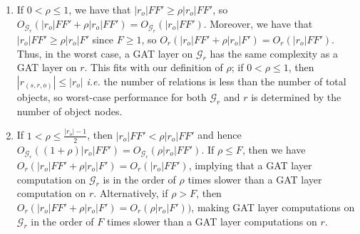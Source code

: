 \begin{enumerate}
    \item If \(0 < \rho \leq 1\), we have that \(|r_o|FF' \geq \rho|r_o|FF'\), so \(O_{\mathcal{G}_r}(|r_o|FF' + \rho|r_o|FF') = O_{\mathcal{G}_r}(|r_o|FF')\). Moreover, we have that \(|r_o|FF' \geq \rho|r_o|F'\) since \(F \geq 1\), so \(O_r(|r_o|FF' + \rho|r_o|F') = O_r(|r_o|FF')\). Thus, in the worst case, a GAT layer on \(\mathcal{G}_r\) has the same complexity as a GAT layer on \(r\). This fits with our definition of \(\rho\); if \(0 < \rho \leq 1\), then \(|r_{(s,r,o)}| \leq |r_o|\) \textit{i.e.} the number of relations is less than the number of total objects, so worst-case performance for both \(\mathcal{G}_r\) and \(r\) is determined by the number of object nodes.
    \item If \(1 < \rho \leq \frac{|r_o| - 1}{2}\), then \(|r_o|FF' < \rho|r_o|FF'\)
    and hence \(O_{\mathcal{G}_r}((1 + \rho)|r_o|FF') = O_{\mathcal{G}_r}(\rho|r_o|FF')\). If \(\rho \leq F\), then we have \(O_r(|r_o|FF' + \rho|r_o|F') = O_r(|r_o|FF')\), implying that a GAT layer computation on \(\mathcal{G}_r\) is in the order of \(\rho\) times slower than a GAT layer computation on \(r\). Alternatively, if \(\rho > F\), then \(O_r(|r_o|FF' + \rho|r_o|F') = O_r(\rho|r_o|F'))\), making GAT layer computations on \(\mathcal{G}_r\) in the order of \(F\) times slower than a GAT layer computations on \(r\).
\end{enumerate}



